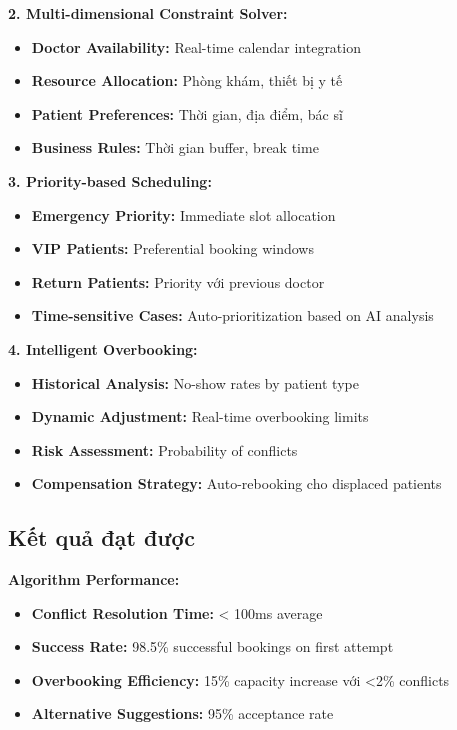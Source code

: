 \documentclass[../DoAn.tex]{subfiles}
\begin{document}
\textbf{2. Multi-dimensional Constraint Solver:}
\begin{itemize}
    \item \textbf{Doctor Availability:} Real-time calendar integration
    \item \textbf{Resource Allocation:} Phòng khám, thiết bị y tế
    \item \textbf{Patient Preferences:} Thời gian, địa điểm, bác sĩ
    \item \textbf{Business Rules:} Thời gian buffer, break time
\end{itemize}

\textbf{3. Priority-based Scheduling:}
\begin{itemize}
    \item \textbf{Emergency Priority:} Immediate slot allocation
    \item \textbf{VIP Patients:} Preferential booking windows
    \item \textbf{Return Patients:} Priority với previous doctor
    \item \textbf{Time-sensitive Cases:} Auto-prioritization based on AI analysis
\end{itemize}

\textbf{4. Intelligent Overbooking:}
\begin{itemize}
    \item \textbf{Historical Analysis:} No-show rates by patient type
    \item \textbf{Dynamic Adjustment:} Real-time overbooking limits
    \item \textbf{Risk Assessment:} Probability of conflicts
    \item \textbf{Compensation Strategy:} Auto-rebooking cho displaced patients
\end{itemize}

\subsection{Kết quả đạt được}

\textbf{Algorithm Performance:}
\begin{itemize}
    \item \textbf{Conflict Resolution Time:} < 100ms average
    \item \textbf{Success Rate:} 98.5\% successful bookings on first attempt
    \item \textbf{Overbooking Efficiency:} 15\% capacity increase với <2\% conflicts
    \item \textbf{Alternative Suggestions:} 95\% acceptance rate
\end{itemize}
\end{document}
